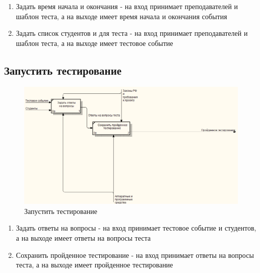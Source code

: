     \begin{enumerate}
        \item Задать время начала и окончания - на вход принимает преподавателей и
        шаблон теста, а на выходе имеет время начала и окончания события
        \item Задать список студентов и для теста - на вход принимает преподавателей
        и шаблон теста, а на выходе имеет тестовое событие
    \end{enumerate}

    \subsection{Запустить тестирование}
    \begin{figure}[H]
        \includegraphics[width=\textwidth, center]{../img/idef0/RunTestDecompose.png}
        \caption{Запустить тестирование}
    \end{figure}

    \begin{enumerate}
        \item Задать ответы на вопросы - на вход принимает тестовое событие и
        студентов, а на выходе имеет ответы на вопросы теста
        \item Сохранить пройденное тестирование  - на вход принимает ответы
        на вопросы теста, а на выходе имеет пройденное тестирование
    \end{enumerate}


